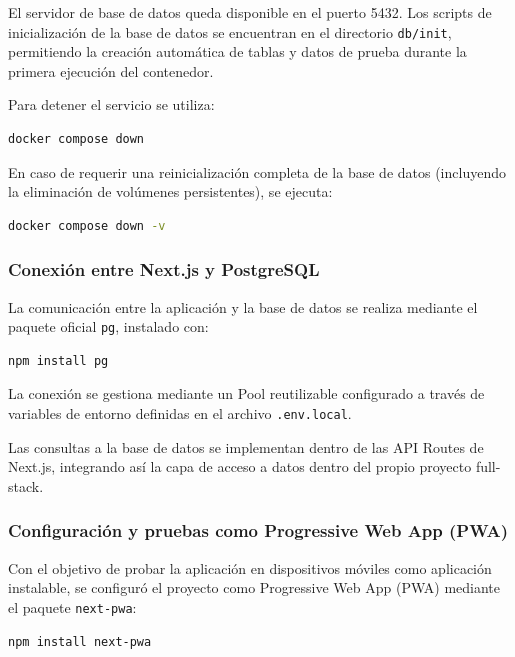 El servidor de base de datos queda disponible en el puerto 5432.  
Los scripts de inicialización de la base de datos se encuentran en el directorio \texttt{db/init}, permitiendo la creación automática de tablas y datos de prueba durante la primera ejecución del contenedor.

Para detener el servicio se utiliza:

\begin{lstlisting}[language=bash]
docker compose down
\end{lstlisting}

En caso de requerir una reinicialización completa de la base de datos (incluyendo la eliminación de volúmenes persistentes), se ejecuta:

\begin{lstlisting}[language=bash]
docker compose down -v
\end{lstlisting}

\subsubsection*{Conexión entre Next.js y PostgreSQL}

La comunicación entre la aplicación y la base de datos se realiza mediante el paquete oficial \texttt{pg}, instalado con:

\begin{lstlisting}[language=bash]
npm install pg
\end{lstlisting}

La conexión se gestiona mediante un Pool reutilizable configurado a través de variables de entorno definidas en el archivo \texttt{.env.local}.  

Las consultas a la base de datos se implementan dentro de las API Routes de Next.js, integrando así la capa de acceso a datos dentro del propio proyecto full-stack.

\subsubsection*{Configuración y pruebas como Progressive Web App (PWA)}

Con el objetivo de probar la aplicación en dispositivos móviles como aplicación instalable, se configuró el proyecto como Progressive Web App (PWA) mediante el paquete \texttt{next-pwa}:

\begin{lstlisting}[language=bash]
npm install next-pwa
\end{lstlisting}

